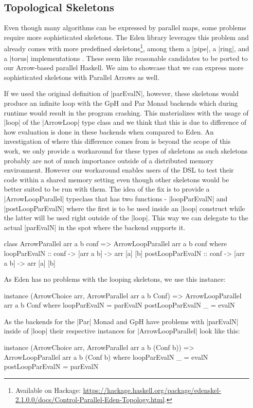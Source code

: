 \subsection{Topological Skeletons}
\label{sec:topology-skeletons}
Even though many algorithms can be expressed by parallel maps, some problems require more sophisticated skeletons. The Eden library leverages this problem and already comes with more predefined skeletons\footnote{Available on Hackage: \url{https://hackage.haskell.org/package/edenskel-2.1.0.0/docs/Control-Parallel-Eden-Topology.html}.}, among them a |pipe|, a |ring|, and a |torus| implementations \citep{Eden:SkeletonBookChapter02}. These seem like reasonable candidates to be ported to our Arrow-based parallel Haskell. We aim to showcase that we can express more sophisticated skeletons with Parallel Arrows as well.

If we used the original definition of |parEvalN|, however, these skeletons would produce an infinite loop with the GpH and Par Monad backends which during runtime would result in the program crashing. This materializes with the usage of |loop| of the |ArrowLoop| type class and we think that this is due to difference of how evaluation is done in these backends when compared to Eden. An investigation of where this difference comes from is beyond the scope of this work, we only provide a workaround for these types of skeletons as such skeletons probably are not of much importance outside of a distributed memory environment. However our workaround enables users of the DSL to test their code within a shared memory setting even though other skeletons would be better suited to be run with them.
The idea of the fix is to provide a |ArrowLoopParallel| typeclass that has two functions - |loopParEvalN| and |postLoopParEvalN| where the first is to be used inside an |loop| construct while the latter will be used right outside of the |loop|. This way we can delegate to the actual |parEvalN| in the spot where the backend supports it.
\begin{code}
class ArrowParallel arr a b conf => ArrowLoopParallel arr a b conf where
    loopParEvalN :: conf -> [arr a b] -> arr [a] [b]
    postLoopParEvalN :: conf -> [arr a b] -> arr [a] [b]
\end{code}
As Eden has no problems with the looping skeletons, we use this instance:
\begin{code}
instance (ArrowChoice arr, ArrowParallel arr a b Conf) => ArrowLoopParallel arr a b Conf where
    loopParEvalN = parEvalN
    postLoopParEvalN _ = evalN
\end{code}
As the backends for the |Par| Monad and GpH have problems with |parEvalN| inside of |loop| their respective instances for |ArrowLoopParallel| look like this:
\begin{code}
instance (ArrowChoice arr, ArrowParallel arr a b (Conf b)) => ArrowLoopParallel arr a b (Conf b) where
    loopParEvalN _ = evalN
    postLoopParEvalN = parEvalN
\end{code}

